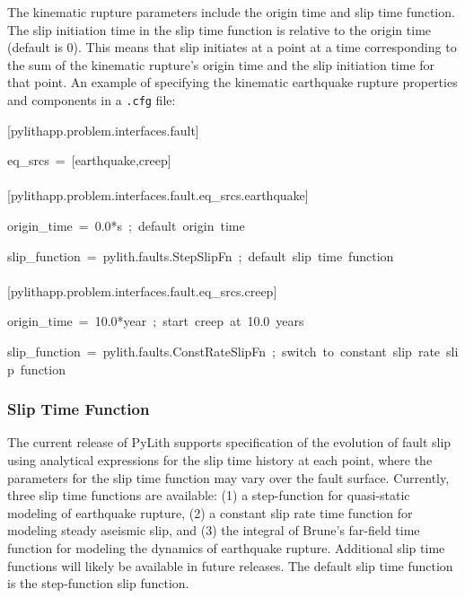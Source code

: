 The kinematic rupture parameters include the origin time and slip
time function. The slip initiation time in the slip time function
is relative to the origin time (default is 0). This means that slip
initiates at a point at a time corresponding to the sum of the kinematic
rupture's origin time and the slip initiation time for that point.
An example of specifying the kinematic earthquake rupture properties
and components in a \texttt{.cfg} file:
\begin{lyxcode}
{\footnotesize{}{[}pylithapp.problem.interfaces.fault{]}}{\footnotesize \par}

{\footnotesize{}eq\_srcs~=~{[}earthquake,creep{]}}~\\
{\footnotesize{}}~\\
{\footnotesize{}{[}pylithapp.problem.interfaces.fault.eq\_srcs.earthquake{]}}{\footnotesize \par}

{\footnotesize{}origin\_time~=~0.0{*}s~;~default~origin~time}{\footnotesize \par}

{\footnotesize{}slip\_function~=~pylith.faults.StepSlipFn~;~default~slip~time~function}~\\
{\footnotesize{}}~\\
{\footnotesize{}{[}pylithapp.problem.interfaces.fault.eq\_srcs.creep{]}}{\footnotesize \par}

{\footnotesize{}origin\_time~=~10.0{*}year~;~start~creep~at~10.0~years}{\footnotesize \par}

{\footnotesize{}slip\_function~=~pylith.faults.ConstRateSlipFn~;~switch~to~constant~slip~rate~slip~function}{\footnotesize \par}
\end{lyxcode}

\subsubsection{Slip Time Function}

The current release of PyLith supports specification of the evolution
of fault slip using analytical expressions for the slip time history
at each point, where the parameters for the slip time function may
vary over the fault surface. Currently, three slip time functions
are available: (1) a step-function for quasi-static modeling of earthquake
rupture, (2) a constant slip rate time function for modeling steady
aseismic slip, and (3) the integral of Brune's far-field time function
\cite{Brune:1970} for modeling the dynamics of earthquake rupture.
Additional slip time functions will likely be available in future
releases. The default slip time function is the step-function slip
function.


